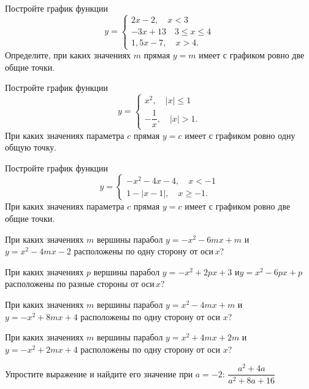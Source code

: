 %

\begin{class}[number=1]
	\begin{listofex}
		\item Постройте график функции
		\[y=	 \left\{
		\begin{array}{l}
			2x-2, \quad x<3\\
			-3x+13 \quad 3\leq x\leq4\\
			1,5x-7, \quad x>4.
		\end{array}
		\right. \]
		Определите, при каких значениях \( m \) прямая \( y=m \) имеет с графиком ровно две общие точки.
		\item Постройте график функции
		\[y=	 \left\{
		\begin{array}{l}
			x^2, \quad |x|\leq1\\
			-\dfrac{1}{x}, \quad |x|>1.
		\end{array}
		\right. \]
		При каких значениях параметра \( c \) прямая \( y=c \) имеет с графиком ровно одну общую точку.
		\item Постройте график функции
		\[y=	 \left\{
		\begin{array}{l}
			-x^2-4x-4, \quad x<-1\\
			1-|x-1|, \quad x\geq-1.
		\end{array}
		\right. \]
		При каких значениях параметра \( c \) прямая \( y=c \) имеет с графиком ровно две общие точки.
	\end{listofex}
\end{class}

\begin{class}[number=2]
	\begin{listofex}
		\item При каких значениях \( m \) вершины парабол \( y =-x^2-6mx+m \) и \( y= x^2-4mx-2 \) расположены по одну сторону от оси \( x \)?		
		\item При каких значениях \( p \) вершины парабол \( y= -x^2+2px+3 \) и\( y= x^2-6px+p \) расположены по разные стороны от оси \( x \)?
		\item При каких значениях \( m \) вершины парабол \( y= x^2-4mx+m \) и \(y=-x^2+8mx+4 \) расположены по одну сторону от оси \( x \)?
	\end{listofex}
\end{class}

\begin{homework}[number=1]
	\begin{listofex}
		\item При каких значениях \( m \) вершины парабол \( y=x^2+4mx+2m \) и \( y=-x^2+2mx+4 \) расположены по одну сторону от оси \( x \)?
		\item Упростите выражение и найдите его значение при \( a=-2 \): \quad \( \dfrac{a^2+4a}{a^2+8a+16} \)
	\end{listofex}
\end{homework}

